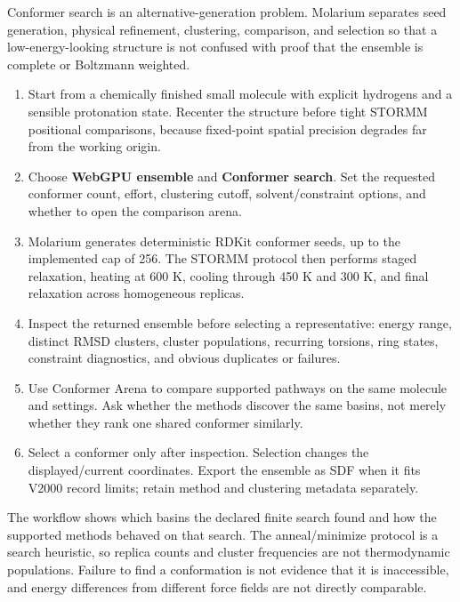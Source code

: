 \documentclass[11pt]{article}
\begin{document}

Conformer search is an alternative-generation problem. Molarium separates seed generation, physical refinement, clustering, comparison, and selection so that a low-energy-looking structure is not confused with proof that the ensemble is complete or Boltzmann weighted.


\begin{enumerate}
\item Start from a chemically finished small molecule with explicit hydrogens and a sensible protonation state. Recenter the structure before tight STORMM positional comparisons, because fixed-point spatial precision degrades far from the working origin.
\item Choose \textbf{WebGPU ensemble} and \textbf{Conformer search}. Set the requested conformer count, effort, clustering cutoff, solvent/constraint options, and whether to open the comparison arena.
\item Molarium generates deterministic RDKit conformer seeds, up to the implemented cap of 256. The STORMM protocol then performs staged relaxation, heating at 600 K, cooling through 450 K and 300 K, and final relaxation across homogeneous replicas.
\item Inspect the returned ensemble before selecting a representative: energy range, distinct RMSD clusters, cluster populations, recurring torsions, ring states, constraint diagnostics, and obvious duplicates or failures.
\item Use Conformer Arena to compare supported pathways on the same molecule and settings. Ask whether the methods discover the same basins, not merely whether they rank one shared conformer similarly.
\item Select a conformer only after inspection. Selection changes the displayed/current coordinates. Export the ensemble as SDF when it fits V2000 record limits; retain method and clustering metadata separately.
\end{enumerate}


The workflow shows which basins the declared finite search found and how the supported methods behaved on that search. The anneal/minimize protocol is a search heuristic, so replica counts and cluster frequencies are not thermodynamic populations. Failure to find a conformation is not evidence that it is inaccessible, and energy differences from different force fields are not directly comparable.
\end{document}
